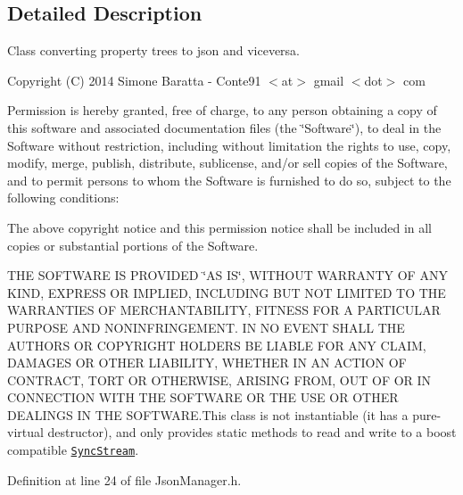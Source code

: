 \subsection{Detailed Description}
Class converting property trees to json and viceversa. 

Copyright (C) 2014 Simone Baratta -\/ Conte91 $<$at$>$ gmail $<$dot$>$ com

Permission is hereby granted, free of charge, to any person obtaining a copy of this software and associated documentation files (the \char`\"{}\+Software\char`\"{}), to deal in the Software without restriction, including without limitation the rights to use, copy, modify, merge, publish, distribute, sublicense, and/or sell copies of the Software, and to permit persons to whom the Software is furnished to do so, subject to the following conditions\+:

The above copyright notice and this permission notice shall be included in all copies or substantial portions of the Software.

T\+H\+E S\+O\+F\+T\+W\+A\+R\+E I\+S P\+R\+O\+V\+I\+D\+E\+D \char`\"{}\+A\+S I\+S\char`\"{}, W\+I\+T\+H\+O\+U\+T W\+A\+R\+R\+A\+N\+T\+Y O\+F A\+N\+Y K\+I\+N\+D, E\+X\+P\+R\+E\+S\+S O\+R I\+M\+P\+L\+I\+E\+D, I\+N\+C\+L\+U\+D\+I\+N\+G B\+U\+T N\+O\+T L\+I\+M\+I\+T\+E\+D T\+O T\+H\+E W\+A\+R\+R\+A\+N\+T\+I\+E\+S O\+F M\+E\+R\+C\+H\+A\+N\+T\+A\+B\+I\+L\+I\+T\+Y, F\+I\+T\+N\+E\+S\+S F\+O\+R A P\+A\+R\+T\+I\+C\+U\+L\+A\+R P\+U\+R\+P\+O\+S\+E A\+N\+D N\+O\+N\+I\+N\+F\+R\+I\+N\+G\+E\+M\+E\+N\+T. I\+N N\+O E\+V\+E\+N\+T S\+H\+A\+L\+L T\+H\+E A\+U\+T\+H\+O\+R\+S O\+R C\+O\+P\+Y\+R\+I\+G\+H\+T H\+O\+L\+D\+E\+R\+S B\+E L\+I\+A\+B\+L\+E F\+O\+R A\+N\+Y C\+L\+A\+I\+M, D\+A\+M\+A\+G\+E\+S O\+R O\+T\+H\+E\+R L\+I\+A\+B\+I\+L\+I\+T\+Y, W\+H\+E\+T\+H\+E\+R I\+N A\+N A\+C\+T\+I\+O\+N O\+F C\+O\+N\+T\+R\+A\+C\+T, T\+O\+R\+T O\+R O\+T\+H\+E\+R\+W\+I\+S\+E, A\+R\+I\+S\+I\+N\+G F\+R\+O\+M, O\+U\+T O\+F O\+R I\+N C\+O\+N\+N\+E\+C\+T\+I\+O\+N W\+I\+T\+H T\+H\+E S\+O\+F\+T\+W\+A\+R\+E O\+R T\+H\+E U\+S\+E O\+R O\+T\+H\+E\+R D\+E\+A\+L\+I\+N\+G\+S I\+N T\+H\+E S\+O\+F\+T\+W\+A\+R\+E.\+This class is not instantiable (it has a pure-\/virtual destructor), and only provides static methods to read and write to a boost compatible \href{http://www.boost.org/doc/libs/1_55_0/doc/html/boost_asio/reference/SyncReadStream.html}{\tt Sync\+Stream}. 

Definition at line 24 of file Json\+Manager.\+h.



